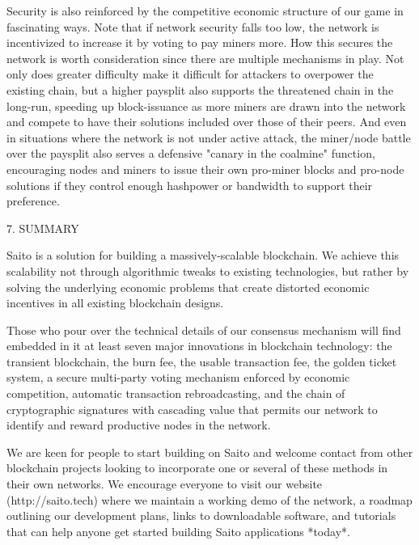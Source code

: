 \documentclass[11.5pt, oneside]{article}   	%
\begin{document}
\begin{multicols}{2}
Security is also reinforced by the competitive economic structure of our game in fascinating ways. Note that if network security falls too low, the network is incentivized to increase it by voting to pay miners more. How this secures the network is worth consideration since there are multiple mechanisms in play. Not only does greater difficulty make it difficult for attackers to overpower the existing chain, but a higher paysplit also supports the threatened chain in the long-run, speeding up block-issuance as more miners are drawn into the network and compete to have their solutions included over those of their peers. And even in situations where the network is not under active attack, the miner/node battle over the paysplit also serves a defensive "canary in the coalmine" function, encouraging nodes and miners to issue their own pro-miner blocks and pro-node solutions if they control enough hashpower or bandwidth to support their preference.

7. SUMMARY

Saito is a solution for building a massively-scalable blockchain. We achieve this scalability not through algorithmic tweaks to existing technologies, but rather by solving the underlying economic problems that create distorted economic incentives in all existing blockchain designs.

Those who pour over the technical details of our consensus mechanism will find embedded in it at least seven major innovations in blockchain technology: the transient blockchain, the burn fee, the usable transaction fee, the golden ticket system, a secure multi-party voting mechanism enforced by economic competition, automatic transaction rebroadcasting, and the chain of cryptographic signatures with cascading value that permits our network to identify and reward productive nodes in the network.  

We are keen for people to start building on Saito and welcome contact from other blockchain projects looking to incorporate one or several of these methods in their own networks. We encourage everyone to visit our website (http://saito.tech) where we maintain a working demo of the network, a roadmap outlining our development plans, links to downloadable software, and tutorials that can help anyone get started building Saito applications *today*.

\end{multicols} 
\end{document}
